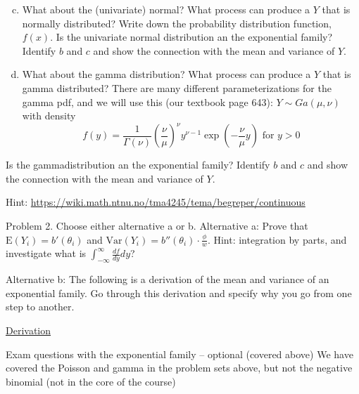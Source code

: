 \documentclass[
  ignorenonframetext,
]{beamer}
\begin{document}
\begin{frame}
\begin{enumerate}
[a)]
\setcounter{enumi}{2}
\item
  What about the (univariate) normal? What process can produce a \(Y\)
  that is normally distributed? Write down the probability distribution
  function, \(f(x)\). Is the univariate normal distribution an the
  exponential family? Identify \(b\) and \(c\) and show the connection
  with the mean and variance of \(Y\).
\item
  What about the gamma distribution? What process can produce a \(Y\)
  that is gamma distributed? There are many different parameterizations
  for the gamma pdf, and we will use this (our textbook page 643):
  \(Y \sim Ga(\mu,\nu)\) with density
  \[ f(y)=\frac{1}{\Gamma(\nu)} (\frac{\nu}{\mu})^{\nu} y^{\nu-1}\exp(-\frac{\nu}{\mu}y) \text{ for }y>0\]
\end{enumerate}

Is the gammadistribution an the exponential family? Identify \(b\) and
\(c\) and show the connection with the mean and variance of \(Y\).

Hint: \url{https://wiki.math.ntnu.no/tma4245/tema/begreper/continuous}
\end{frame}

\begin{frame}
\begin{block}{Problem 2. Choose either alternative a or b.}
\label{problem-2.-choose-either-alternative-a-or-b.}
Alternative a: Prove that \(\text{E}(Y_i)=b'(\theta_i)\) and
\(\text{Var}(Y_i)=b''(\theta_i)\cdot \frac{\phi}{w}\). Hint: integration
by parts, and investigate what is
\(\int_{-\infty}^{\infty} \frac{df}{dy}dy\)?

Alternative b: The following is a derivation of the mean and variance of
an exponential family. Go through this derivation and specify why you go
from one step to another.

\href{https://www.math.ntnu.no/emner/TMA4315/2017h/M5ExpFamProofEVar.pdf}{Derivation}
\end{block}
\end{frame}

\begin{frame}
\begin{block}{Exam questions with the exponential family -- optional
(covered above)}
\label{exam-questions-with-the-exponential-family-optional-covered-above}
We have covered the Poisson and gamma in the problem sets above, but not
the negative binomial (not in the core of the course)
\end{block}
\end{frame}
\end{document}
